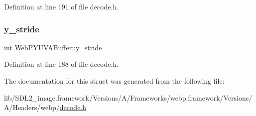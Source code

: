 Definition at line 191 of file decode.\+h.

\mbox{\label{struct_web_p_y_u_v_a_buffer_a8dc1351e8df61c8047f66a925c146f1a}} 
\subsubsection{\texorpdfstring{y\_stride}{y\_stride}}
{\footnotesize\ttfamily int Web\+P\+Y\+U\+V\+A\+Buffer\+::y\+\_\+stride}



Definition at line 188 of file decode.\+h.



The documentation for this struct was generated from the following file\+:\begin{DoxyCompactItemize}
\item 
lib/\+S\+D\+L2\+\_\+image.\+framework/\+Versions/\+A/\+Frameworks/webp.\+framework/\+Versions/\+A/\+Headers/webp/\mbox{\hyperlink{decode_8h}{decode.\+h}}\end{DoxyCompactItemize}
